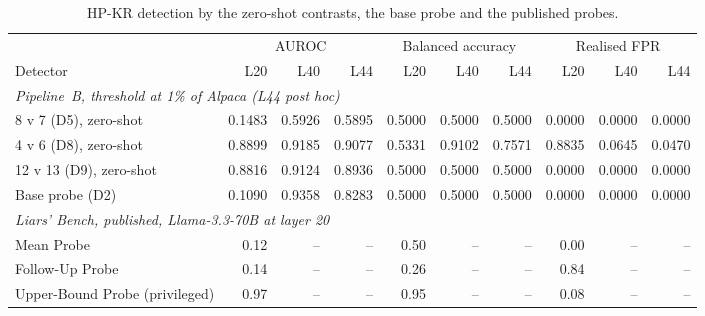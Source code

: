 \begin{table}[t]
\centering
\footnotesize
\setlength{\tabcolsep}{3.5pt}
\caption{HP-KR detection by the zero-shot contrasts, the base probe and the published probes.}
\label{tab:r-hpkr}
\begin{tabular}{p{31mm}rrrrrrrrr}
\hline
 & \multicolumn{3}{c}{AUROC} & \multicolumn{3}{c}{Balanced accuracy} & \multicolumn{3}{c}{Realised FPR} \\
Detector & L20 & L40 & L44 & L20 & L40 & L44 & L20 & L40 & L44 \\
\hline
\multicolumn{10}{l}{\emph{Pipeline~B, threshold at 1\% of Alpaca (L44 post hoc)}} \\
8 v 7 (D5), zero-shot & 0.1483 & 0.5926 & 0.5895 & 0.5000 & 0.5000 & 0.5000 & 0.0000 & 0.0000 & 0.0000 \\
4 v 6 (D8), zero-shot & 0.8899 & 0.9185 & 0.9077 & 0.5331 & 0.9102 & 0.7571 & 0.8835 & 0.0645 & 0.0470 \\
12 v 13 (D9), zero-shot & 0.8816 & 0.9124 & 0.8936 & 0.5000 & 0.5000 & 0.5000 & 0.0000 & 0.0000 & 0.0000 \\
Base probe (D2) & 0.1090 & 0.9358 & 0.8283 & 0.5000 & 0.5000 & 0.5000 & 0.0000 & 0.0000 & 0.0000 \\
\multicolumn{10}{l}{\emph{Liars' Bench, published, Llama-3.3-70B at layer 20} \parencite[pp.~54--56]{kretschmar2025liars}} \\
Mean Probe & 0.12 & -- & -- & 0.50 & -- & -- & 0.00 & -- & -- \\
Follow-Up Probe & 0.14 & -- & -- & 0.26 & -- & -- & 0.84 & -- & -- \\
Upper-Bound Probe (privileged) & 0.97 & -- & -- & 0.95 & -- & -- & 0.08 & -- & -- \\
\hline
\end{tabular}
\end{table}

